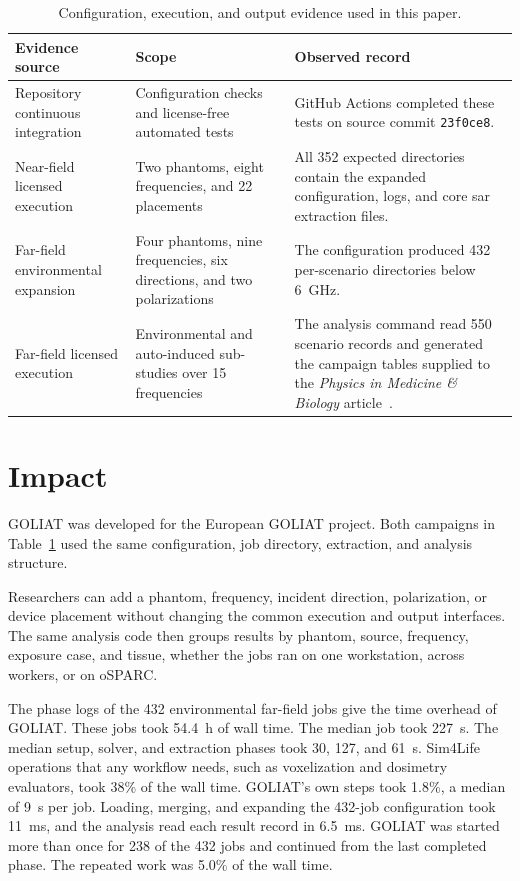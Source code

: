 \documentclass[final,5p,times,twocolumn]{elsarticle}
\begin{document}
\begin{table}[!ht]
\centering
\small
\begin{tabularx}{\textwidth}{@{}>{\raggedright\arraybackslash}p{}>{\raggedright\arraybackslash}p{}>{\raggedright\arraybackslash}X@{}}
\toprule
Evidence source & Scope & Observed record \\
\midrule
Repository continuous integration & Configuration checks and license-free automated tests & GitHub Actions completed these tests on source commit \texttt{23f0ce8}. \\
Near-field licensed execution & Two phantoms, eight frequencies, and 22 placements & All 352 expected directories contain the expanded configuration, logs, and core \gls{sar} extraction files. \\
Far-field environmental expansion & Four phantoms, nine frequencies, six directions, and two polarizations & The configuration produced 432 per-scenario directories below 6~GHz. \\
Far-field licensed execution & Environmental and auto-induced sub-studies over 15 frequencies & The analysis command read 550 scenario records and generated the campaign tables supplied to the \emph{Physics in Medicine \& Biology} article~\cite{GOLIATFarField}. \\
\bottomrule
\end{tabularx}
\caption{Configuration, execution, and output evidence used in this paper.}
\label{tab:evidence}
\end{table}

\FloatBarrier
\section{Impact}

GOLIAT was developed for the European GOLIAT project. Both campaigns in Table~\ref{tab:evidence} used the same configuration, job directory, extraction, and analysis structure.

Researchers can add a phantom, frequency, incident direction, polarization, or device placement without changing the common execution and output interfaces. The same analysis code then groups results by phantom, source, frequency, exposure case, and tissue, whether the jobs ran on one workstation, across workers, or on oSPARC.

The phase logs of the 432 environmental far-field jobs give the time overhead of GOLIAT. These jobs took 54.4~h of wall time. The median job took 227~s. The median setup, solver, and extraction phases took 30, 127, and 61~s. Sim4Life operations that any workflow needs, such as voxelization and dosimetry evaluators, took 38\% of the wall time. GOLIAT's own steps took 1.8\%, a median of 9~s per job. Loading, merging, and expanding the 432-job configuration took 11~ms, and the analysis read each result record in 6.5~ms. GOLIAT was started more than once for 238 of the 432 jobs and continued from the last completed phase. The repeated work was 5.0\% of the wall time.
\end{document}
